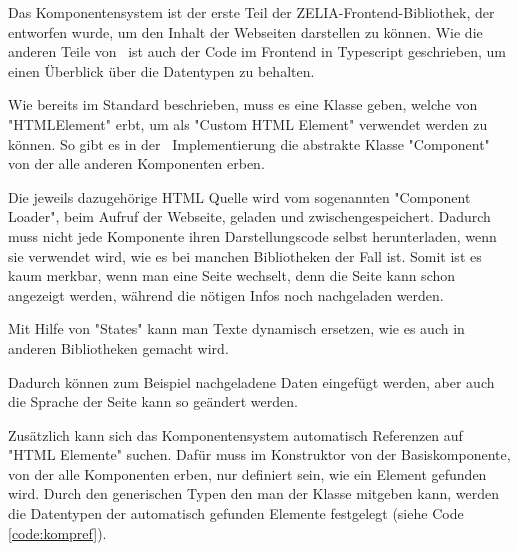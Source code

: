 


Das Komponentensystem ist der erste Teil der ZELIA-Frontend-Bibliothek, der entworfen wurde, um den Inhalt der Webseiten darstellen zu können. Wie die anderen Teile von \ZELIA\ ist auch der Code im Frontend in Typescript geschrieben, um einen Überblick über die Datentypen zu behalten. 


Wie bereits im Standard beschrieben, muss es eine Klasse geben, welche von "HTMLElement" erbt, um als "Custom HTML Element" verwendet werden zu können. So gibt es in der \ZELIA\ Implementierung die abstrakte Klasse "Component" von der alle anderen Komponenten erben.


Die jeweils dazugehörige HTML Quelle wird vom sogenannten "Component Loader", beim Aufruf der Webseite, geladen und zwischengespeichert. Dadurch muss nicht jede Komponente ihren Darstellungscode selbst herunterladen, wenn sie verwendet wird, wie es bei manchen Bibliotheken der Fall ist. Somit ist es kaum merkbar, wenn man eine Seite wechselt, denn die Seite kann schon angezeigt werden, während die nötigen Infos noch nachgeladen werden.

Mit Hilfe von "States" kann man Texte dynamisch ersetzen, wie es auch in anderen Bibliotheken gemacht wird.



Dadurch können zum Beispiel nachgeladene Daten eingefügt werden, aber auch die Sprache der Seite kann so geändert werden.

Zusätzlich kann sich das Komponentensystem automatisch Referenzen auf "HTML Elemente" suchen. Dafür muss im Konstruktor von der Basiskomponente, von der alle Komponenten erben, nur definiert sein, wie ein Element gefunden wird. Durch den generischen Typen den man der Klasse mitgeben kann, werden die Datentypen der automatisch gefunden Elemente festgelegt (siehe Code \ref{code:kompref}).



